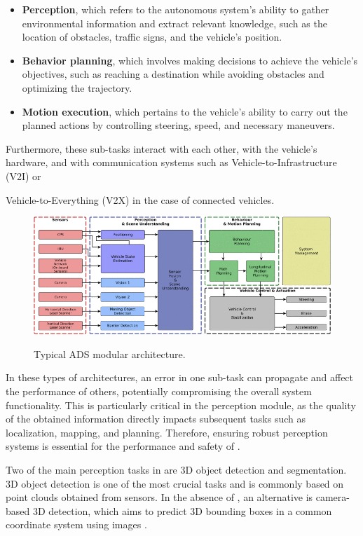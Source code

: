 \begin{itemize}  
    \item \textbf{Perception}, which refers to the autonomous system's ability to gather environmental information and extract relevant knowledge, such as the location of obstacles, traffic signs, and the vehicle's position.  
    \item \textbf{Behavior planning}, which involves making decisions to achieve the vehicle's objectives, such as reaching a destination while avoiding obstacles and optimizing the trajectory.  
    \item \textbf{Motion execution}, which pertains to the vehicle's ability to carry out the planned actions by controlling steering, speed, and necessary maneuvers.  
\end{itemize}

Furthermore, these \mbox{sub-tasks} interact with each other, with the vehicle's hardware, and with communication systems such as Vehicle-to-Infrastructure (V2I) or {Vehicle-to-Everything (V2X) in the case of connected vehicles.

\begin{figure}[H]
    \centering
    \includegraphics[width=\linewidth]{images/sota/ADS_information_flow.png}
    \label{sota_ads_information_flow}
    \caption{Typical ADS modular architecture.}
\end{figure}

In these types of architectures, an error in one \mbox{sub-task} can propagate and affect the performance of others, potentially compromising the overall system functionality. This is particularly critical in the perception module, as the quality of the obtained information directly impacts subsequent tasks such as localization, mapping, and planning. Therefore, ensuring robust perception systems is essential for the performance and safety of .

Two of the main perception tasks in  are 3D object detection and  segmentation. 3D object detection is one of the most crucial tasks and is commonly based on point clouds obtained from  sensors. In the absence of , an alternative is camera-based 3D detection, which aims to predict 3D bounding boxes in a common coordinate system using images \cite{3d_object_detection}.

}
